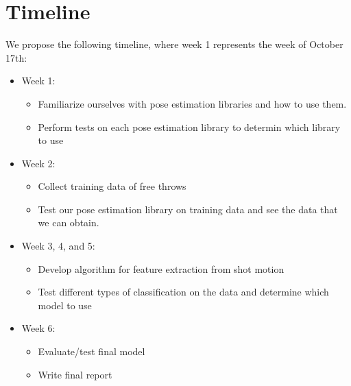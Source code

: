 \documentclass[10pt,twocolumn,letterpaper]{article}
\begin{document}
\section{Timeline}
We propose the following timeline, where week 1 represents the week of October 17th:
\begin{itemize}
  \item Week 1: \begin{itemize}
    \item Familiarize ourselves with pose estimation libraries and how to use them.
    \item Perform tests on each pose estimation library to determin which library to use
  \end{itemize}
  \item Week 2: \begin{itemize}
    \item Collect training data of free throws
    \item Test our pose estimation library on training data and see the data that we can obtain.
  \end{itemize}
  \item Week 3, 4, and 5: \begin{itemize}
    \item Develop algorithm for feature extraction from shot motion
    \item Test different types of classification on the data and determine which model to use
  \end{itemize}
  \item Week 6: \begin{itemize}
    \item Evaluate/test final model
    \item Write final report
  \end{itemize}
\end{itemize}

{\small


}
\end{document}
